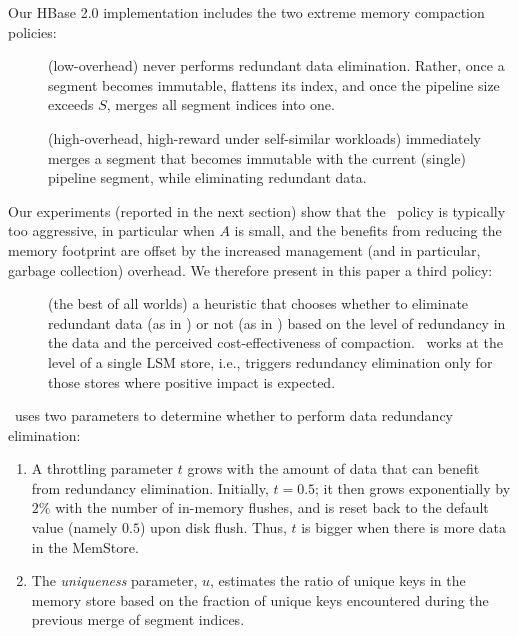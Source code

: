 Our HBase 2.0 implementation includes the two extreme memory compaction policies:
\begin{description}
\item[\basic] (low-overhead) never performs redundant data elimination. Rather, 
once a segment becomes immutable, flattens its index, and once the pipeline size exceeds $S$, merges all segment indices into one.   
\item[\eager] (high-overhead, high-reward under self-similar workloads) immediately merges a segment that becomes immutable 
with the current  (single) pipeline segment, while eliminating redundant data.
\end{description}

Our experiments (reported in the next section) show that the \eager\ policy is typically too aggressive, in particular when $A$ is small,
and the benefits from reducing the memory footprint are offset by the increased management (and in particular, garbage collection) overhead.
We therefore present in this paper a third policy:
\begin{description}
\item[\adp] (the best of all worlds) a heuristic that chooses 
whether to eliminate redundant data  (as in \eager) or not (as in \basic) based on the level of redundancy in the data 
and the perceived cost-effectiveness of compaction. \adp\ works at the level of a single LSM store, i.e., triggers 
redundancy elimination only for those stores where positive impact is expected. 
\end{description}

\adp\ uses two parameters to determine whether to perform data redundancy elimination:
\begin{enumerate}
\item
A throttling parameter $t$  grows with the amount of data that can benefit from redundancy elimination. 
Initially, $t=0.5$; it then grows exponentially by $2\%$ with the number of in-memory flushes, and is reset back to 
the default value (namely $0.5$) upon disk flush. Thus, $t$ is bigger when there is more data in the MemStore.
\item
The \emph{uniqueness} parameter, $u$, estimates the ratio of unique keys in the memory store based on the 
fraction of unique keys encountered during the previous merge of segment indices. 
\end{enumerate}

